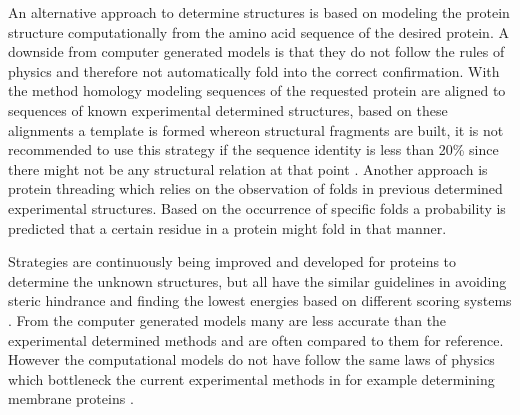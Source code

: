An alternative approach to determine structures is based on modeling the protein structure computationally from the amino acid sequence of the desired protein. A downside from computer generated models is that they do not follow the rules of physics and therefore not automatically fold into the correct confirmation. With the method homology modeling sequences of the requested protein are aligned to sequences of known experimental determined structures, based on these alignments a template is formed whereon structural fragments are built, it is not recommended to use this strategy if the sequence identity is less than 20\% since there might not be any structural relation at that point \cite{}.
Another approach is protein threading which relies on the observation of folds in previous determined experimental structures. Based on the occurrence of specific folds a probability is predicted that a certain residue in a protein might fold in that manner. 

Strategies are continuously being improved and developed for proteins to determine the unknown structures, but all have the similar guidelines in avoiding steric hindrance \cite{} and finding the lowest energies based on different scoring systems \cite{}. From the computer generated models many are less accurate than the experimental determined methods and are often compared to them for reference. However the computational models do not have follow the same laws of physics which bottleneck the current experimental methods in for example determining membrane proteins \cite{}.


%
%
%



%
%

